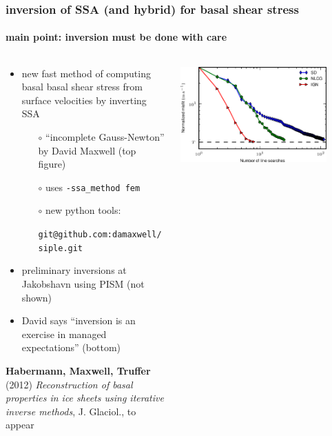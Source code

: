 \documentclass[hide notes,intlimits]{beamer}
\begin{document}
\begin{frame}
  \frametitle{inversion of SSA (and hybrid) for basal shear stress}
  \framesubtitle{main point: inversion must be done with care}

\begin{columns}
\begin{column}{0.5\textwidth}
\vspace{-8mm}
  \begin{itemize}
  \small
  \item new fast method of computing basal basal shear stress from surface velocities by inverting SSA
    \begin{itemize}
    \small
    \item[$\circ$] ``incomplete Gauss-Newton'' by David Maxwell (top figure)
    \item[$\circ$] uses \texttt{-ssa\_method fem}
    \item[$\circ$] new python tools:

    \medskip
    \tiny \texttt{git@github.com:damaxwell/siple.git}
    \end{itemize}
  \item preliminary inversions at Jakobshavn using PISM (not shown)
  \item David says ``inversion is an exercise in managed expectations'' (bottom)
  \end{itemize}

\begin{flushleft}
\scriptsize \textbf{Habermann, Maxwell, Truffer} (2012) \emph{Reconstruction of basal properties in ice sheets using iterative inverse methods}, J. Glaciol., to appear
\end{flushleft}
\end{column}

\begin{column}{0.5\textwidth}
\vspace{-5mm}
  \begin{center}
    \includegraphics[width=0.85\textwidth]{ign_vs_other}


\end{center}
\end{column}
\end{columns}
\end{frame}
\end{document}
